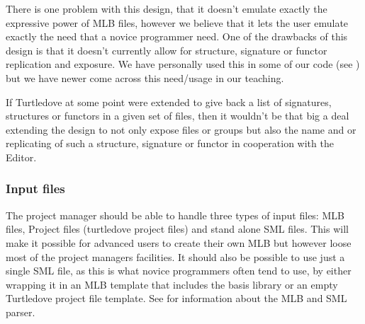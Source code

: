 There is one problem with this design, that it doesn't emulate exactly the
expressive power of MLB files, however we believe that it lets the user emulate
exactly the need that a novice programmer need. One of the drawbacks of this
design is that it doesn't currently allow for structure, signature or functor
replication and exposure. We have personally used this in some of our code (see
) but we have newer come across this need/usage in our
teaching.

If Turtledove at some point were extended to give back a list of
signatures, structures or functors in a given set of files, then it wouldn't be
that big a deal extending the design to not only expose files or groups but also
the name and or replicating of such a structure, signature or functor in
cooperation with the Editor.

\subsubsection{Input files}

The project manager should be able to handle three types of input files: MLB files,
Project files (turtledove project files) and stand alone SML files. This will
make it possible for advanced users to create their own MLB but however loose
most of the project managers facilities. It should also be possible to use just
a single SML file, as this is what novice programmers often tend to use, by either
wrapping it in an MLB template that includes the basis library or an empty Turtledove
project file template. See  for information about the
MLB and SML parser.

